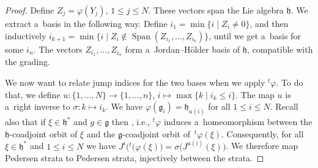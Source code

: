 \documentclass[10pt,a4paper]{amsart}
\newcommand{\Ad}{\operatorname{Ad}} %
\newcommand{\Span}{\operatorname{Span}} %
\newcommand{\g}{\mathfrak{g}} %
\newcommand{\tsp}[1]{{}^t \! #1} %
\begin{document}
\begin{proof}
 Define $Z_j = \varphi(Y_j)$, $1\leq j \leq N$. These vectors span the Lie algebra $\mathfrak{h}$. We extract a~basis in the following way. Define $i_1 = \min\{i\mid Z_i \neq 0\}$,
 and then inductively $i_{k+1} = \min\{i \mid Z_i \notin \Span(Z_{i_1},\dots, Z_{i_k})\}$,
 until we get a~basis for some $i_n$.
 The vectors $Z_{i_1}, \dots, Z_{i_n}$ form a~Jordan--H\"older basis of $\mathfrak{h}$, compatible with the grading.

 We now want to relate jump indices for the two bases when we apply $\tsp\varphi$. To do that, we define
$u \colon  \{1,\dots,N\}  \to \{1,\dots,n\}$, $ i \mapsto \max\{k\mid i_k \leq i\}$.
 The map $u$ is a~right inverse to $\sigma \colon k \mapsto i_k$. We have $\varphi(\g_i) = \mathfrak{h}_{u(i)}$ for all $1\leq i \leq N$. Recall also that if $\xi \in \mathfrak{h}^*$ and $g \in \g$ then \smash{$\tsp\varphi\bigl(\Ad^*_{\varphi(g)}(\xi)\bigr) = \Ad^*_g\bigl(\tsp\varphi(\xi)\bigr)$},
 i.e., $\tsp\varphi$ induces a~homeomorphism between the $\mathfrak{h}$-coadjoint orbit of $\xi$ and the $\g$-coadjoint orbit of~$\tsp\varphi(\xi)$.
 Consequently, for all $\xi \in \mathfrak{h}^*$ and $1\leq i \leq N$ we have $J^i\bigl(\tsp(\varphi(\xi)\bigr) = \sigma\bigl(J^{u(i)}(\xi)\bigr)$.
 We therefore map Pedersen strata to Pedersen strata, injectively between the strata.
\end{proof}
\end{document}
